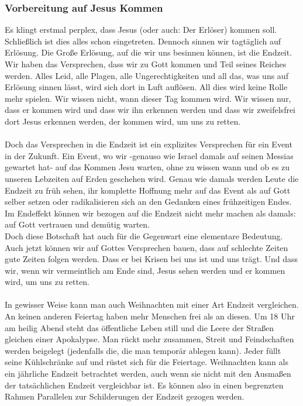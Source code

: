 \subsubsection*{Vorbereitung auf Jesus Kommen}
Es klingt erstmal perplex, dass Jesus (oder auch: Der Erlöser) kommen soll. Schließlich ist dies alles schon eingetreten. Dennoch sinnen wir tagtäglich auf Erlösung. Die Große Erlösung, auf die wir uns besinnen können, ist die Endzeit. Wir haben das Versprechen, dass wir zu Gott kommen und Teil seines Reiches werden. Alles Leid, alle Plagen, alle Ungerechtigkeiten und all das, was uns auf Erlösung sinnen lässt, wird sich dort in Luft auflösen. All dies wird keine Rolle mehr spielen. Wir wissen nicht, wann dieser Tag kommen wird. Wir wissen nur, dass er kommen wird und dass wir ihn erkennen werden und dass wir zweifelsfrei dort Jesus erkennen werden, der kommen wird, um uns zu retten.
\\~\\
Doch das Versprechen in die Endzeit ist ein explizites Versprechen für ein Event in der Zukunft. Ein Event, wo wir -genauso wie Israel damals auf seinen Messias gewartet hat- auf das Kommen Jesu warten, ohne zu wissen wann und ob es zu unseren Lebzeiten auf Erden geschehen wird. Genau wie damals werden Leute die Endzeit zu früh sehen, ihr komplette Hoffnung mehr auf das Event als auf Gott selber setzen oder radikalisieren sich an den Gedanken eines frühzeitigen Endes. Im Endeffekt können wir bezogen auf die Endzeit nicht mehr machen als damals: auf Gott vertrauen und demütig warten.
\\ 
Doch diese Botschaft hat auch für die Gegenwart eine elementare Bedeutung. Auch jetzt können wir auf Gottes Versprechen bauen, dass auf schlechte Zeiten gute Zeiten folgen werden. Dass er bei Krisen bei uns ist und uns trägt. Und dass wir, wenn wir vermeintlich am Ende sind, Jesus sehen werden und er kommen wird, um uns zu retten. 
\\~\\
In gewisser Weise kann man auch Weihnachten mit einer Art Endzeit vergleichen. An keinen anderen Feiertag haben mehr Menschen frei als an diesen. Um 18 Uhr am heilig Abend steht das öffentliche Leben still und die Leere der Straßen gleichen einer Apokalypse. Man rückt mehr zusammen, Streit und Feindschaften werden beigelegt (jedenfalls die, die man temporär ablegen kann). Jeder füllt seine Kühlschränke auf und rüstet sich für die Feiertage. Weihnachten kann als ein jährliche Endzeit betrachtet werden, auch wenn sie nicht mit den Ausmaßen der tatsächlichen Endzeit vergleichbar ist. Es können also in einen begrenzten Rahmen Parallelen zur Schilderungen der Endzeit gezogen werden.

